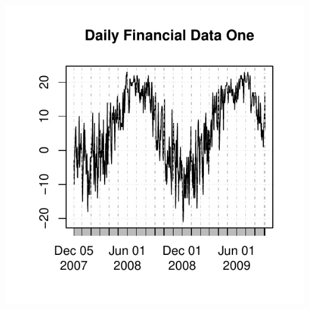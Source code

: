 \documentclass{article}\usepackage[]{graphicx}\usepackage[]{color}
\makeatletter
\def\maxwidth{ %
  \ifdim\Gin@nat@width>\linewidth
    \linewidth
  \else
    \Gin@nat@width
  \fi
}
\newenvironment{knitrout}{}{} %
\theoremstyle{definition}
\newcommand{\pkg}[1]{{\fontseries{b}\selectfont #1}}
\makeatother
\begin{document}
\begin{knitrout}
\color{fgcolor}

{\centering \includegraphics[width=\maxwidth]{figure/get_dat-1} 

}



\end{knitrout}

\end{document}
